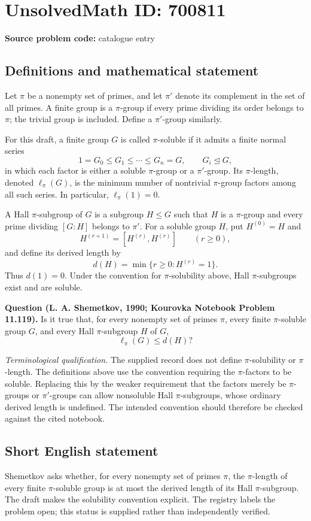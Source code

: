 \documentclass[11pt]{article}
\begin{document}
\section*{UnsolvedMath ID: 700811}
\textbf{Source problem code:} catalogue entry
\subsection{Definitions and mathematical statement}
Let \(\pi\) be a nonempty set of primes, and let \(\pi'\) denote its complement in the set of all primes. A finite group is a \(\pi\)-group if every prime dividing its order belongs to \(\pi\); the trivial group is included. Define a \(\pi'\)-group similarly.

For this draft, a finite group \(G\) is called \(\pi\)-soluble if it admits a finite normal series
\[
1=G_0\leq G_1\leq\cdots\leq G_n=G,
\qquad G_i\trianglelefteq G,
\]
in which each factor is either a soluble \(\pi\)-group or a \(\pi'\)-group. Its \(\pi\)-length, denoted \(\ell_\pi(G)\), is the minimum number of nontrivial \(\pi\)-group factors among all such series. In particular, \(\ell_\pi(1)=0\).

A Hall \(\pi\)-subgroup of \(G\) is a subgroup \(H\leq G\) such that \(H\) is a \(\pi\)-group and every prime dividing \([G:H]\) belongs to \(\pi'\). For a soluble group \(H\), put \(H^{(0)}=H\) and
\[
H^{(r+1)}=[H^{(r)},H^{(r)}]\qquad(r\geq0),
\]
and define its derived length by
\[
d(H)=\min\{r\geq0:H^{(r)}=1\}.
\]
Thus \(d(1)=0\). Under the convention for \(\pi\)-solubility above, Hall \(\pi\)-subgroups exist and are soluble.

\textbf{Question (L. A. Shemetkov, 1990; Kourovka Notebook Problem 11.119).} Is it true that, for every nonempty set of primes \(\pi\), every finite \(\pi\)-soluble group \(G\), and every Hall \(\pi\)-subgroup \(H\) of \(G\),
\[
\ell_\pi(G)\leq d(H)?
\]

\textit{Terminological qualification.} The supplied record does not define \(\pi\)-solubility or \(\pi\)-length. The definitions above use the convention requiring the \(\pi\)-factors to be soluble. Replacing this by the weaker requirement that the factors merely be \(\pi\)-groups or \(\pi'\)-groups can allow nonsoluble Hall \(\pi\)-subgroups, whose ordinary derived length is undefined. The intended convention should therefore be checked against the cited notebook.
\subsection{Short English statement}
Shemetkov asks whether, for every nonempty set of primes \(\pi\), the \(\pi\)-length of every finite \(\pi\)-soluble group is at most the derived length of its Hall \(\pi\)-subgroup. The draft makes the solubility convention explicit. The registry labels the problem open; this status is supplied rather than independently verified.
\end{document}
